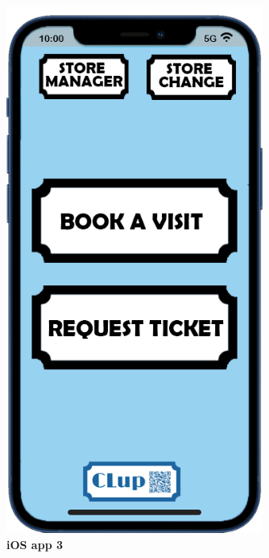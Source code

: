 \begin{figure}[!b]
\begin{minipage}{0.4\textwidth}
\includegraphics[width=0.75\textwidth]{Images/App/iPhone_MainScreenv2}
\captionsetup{justification=centering}
\caption{\label{fig:ios3}\textbf{iOS app 3}}
\end{minipage}
\end{figure}

